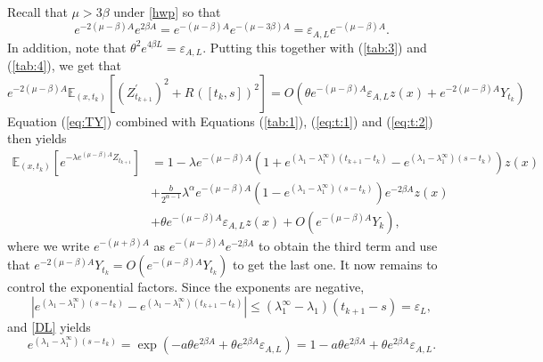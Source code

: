 \documentclass[11pt]{article}
\theoremstyle{plain}
\newcommand\linf{\lambda_1^\infty}
\newcommand\vep{\varepsilon}
\begin{document}
Recall that $\mu>3\beta$ under \eqref{hwp} so that
\begin{equation*}
e^{-2(\mu-\beta)A}e^{2\beta A}=  e^{-(\mu-\beta)A}e^{-(\mu-3\beta)A}=\vep_{A,L}e^{-(\mu-\beta)A}.
\end{equation*}
In addition, note that $\theta^2e^{4\beta L}=\vep_{A,L}.$
Putting this together with (\ref{tab:3}) and (\ref{tab:4}), we get that
\begin{equation}
e^{-2(\mu-\beta)A}\mathbb{E}_{(x,t_k)}\left[\left(Z^{'}_{t_{k+1}}\right)^2+R^{}([t_k,s])^2\right]=O\left(\theta e^{-(\mu-\beta)A}\vep_{A,L}z(x)+e^{-2(\mu-\beta)A}Y_{t_k}\right) \label{eq:t:2}
\end{equation}
Equation (\ref{eq:TY}) combined with  Equations (\ref{tab:1}), (\ref{eq:t:1}) and (\ref{eq:t:2}) then yields
\begin{align*}
\mathbb{E}_{(x,t_k)}\left[e^{-\lambda e^{(\mu-\beta)A}Z_{t_{k+1}}}\right]&=1-\lambda e^{-(\mu-\beta)A}\left(1+e^{(\lambda_1-\linf)(t_{k+1}-t_k)}-e^{(\lambda_1-\linf)(s-t_k)}\right)z(x)\\
&+\frac{b}{2^{\alpha-1}}\lambda^\alpha e^{-(\mu-\beta)A}\left(1-e^{(\lambda_1-\linf)(s-t_k)}\right)e^{-2\beta A}z(x)\\
& + \theta e^{-(\mu-\beta)A}\vep_{A,L}z(x)+ O\left(e^{-(\mu-\beta)A}Y_k\right),
\end{align*}
where we write $e^{-(\mu+\beta)A}$ as $e^{-(\mu-\beta)A}e^{-2\beta A}$ to obtain the third term and use that $e^{-2(\mu-\beta)A}Y_{t_k}=O\left(e^{-(\mu-\beta)A}Y_{t_k}\right)$ to get the last one.
It now remains to control the exponential factors. Since the exponents are negative,
\begin{equation*}
\left|e^{(\lambda_1-\linf)(s-t_k)}-e^{(\lambda_1-\linf)(t_{k+1}-t_k)}\right|\leqslant (\linf-\lambda_1)(t_{k+1}-s)=\vep_L,
\end{equation*}
and  \eqref{DL} yields
\begin{equation*}
e^{(\lambda_1-\linf)(s-t_k)} = \exp\left(-a\theta e^{2\beta A}+\theta e^{2\beta A}\vep_{A,L}\right)=1-a\theta e^{2\beta A}+\theta e^{2\beta A}\vep_{A,L}.
\end{equation*}
\end{document}
